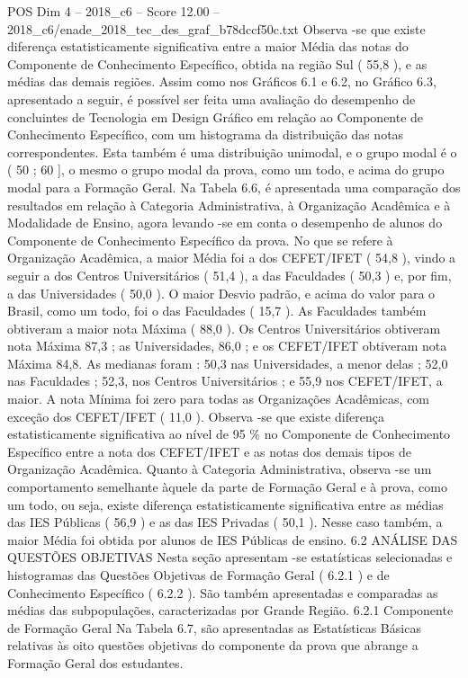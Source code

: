 \begin{textsample}{POS Dim 4 – 2018\_c6 – Score 12.00 – 2018\_c6/enade\_2018\_tec\_des\_graf\_b78dccf50c.txt}
Observa -se que existe diferença estatisticamente significativa entre a maior Média das notas do Componente de Conhecimento Específico, obtida na região Sul ( 55,8 ), e as médias das demais regiões.
Assim como nos Gráficos 6.1 e 6.2, no Gráfico 6.3, apresentado a seguir, é possível ser feita uma avaliação do desempenho de concluintes de Tecnologia em Design Gráfico em relação ao Componente de Conhecimento Específico, com um histograma da distribuição das notas correspondentes.
Esta também é uma distribuição unimodal, e o grupo modal é o ( 50 ; 60 ], o mesmo o grupo modal da prova, como um todo, e acima do grupo modal para a Formação Geral.
Na Tabela 6.6, é apresentada uma comparação dos resultados em relação à Categoria Administrativa, à Organização Acadêmica e à Modalidade de Ensino, agora levando -se em conta o desempenho de alunos do Componente de Conhecimento Específico da prova.
No que se refere à Organização Acadêmica, a maior Média foi a dos CEFET/IFET ( 54,8 ), vindo a seguir a dos Centros Universitários ( 51,4 ), a das Faculdades ( 50,3 ) e, por fim, a das Universidades ( 50,0 ).
O maior Desvio padrão, e acima do valor para o Brasil, como um todo, foi o das Faculdades ( 15,7 ).
As Faculdades também obtiveram a maior nota Máxima ( 88,0 ).
Os Centros Universitários obtiveram nota Máxima 87,3 ; as Universidades, 86,0 ; e os CEFET/IFET obtiveram nota Máxima 84,8.
As medianas foram : 50,3 nas Universidades, a menor delas ; 52,0 nas Faculdades ; 52,3, nos Centros Universitários ; e 55,9 nos CEFET/IFET, a maior.
A nota Mínima foi zero para todas as Organizações Acadêmicas, com exceção dos CEFET/IFET ( 11,0 ).
Observa -se que existe diferença estatisticamente significativa ao nível de 95 \% no Componente de Conhecimento Específico entre a nota dos CEFET/IFET e as notas dos demais tipos de Organização Acadêmica.
Quanto à Categoria Administrativa, observa -se um comportamento semelhante àquele da parte de Formação Geral e à prova, como um todo, ou seja, existe diferença estatisticamente significativa entre as médias das IES Públicas ( 56,9 ) e as das IES Privadas ( 50,1 ).
Nesse caso também, a maior Média foi obtida por alunos de IES Públicas de ensino. 6.2 ANÁLISE DAS QUESTÕES OBJETIVAS Nesta seção apresentam -se estatísticas selecionadas e histogramas das Questões Objetivas de Formação Geral ( 6.2.1 ) e de Conhecimento Específico ( 6.2.2 ).
São também apresentadas e comparadas as médias das subpopulações, caracterizadas por Grande Região. 6.2.1 Componente de Formação Geral Na Tabela 6.7, são apresentadas as Estatísticas Básicas relativas às oito questões objetivas do componente da prova que abrange a Formação Geral dos estudantes.

\end{textsample}
